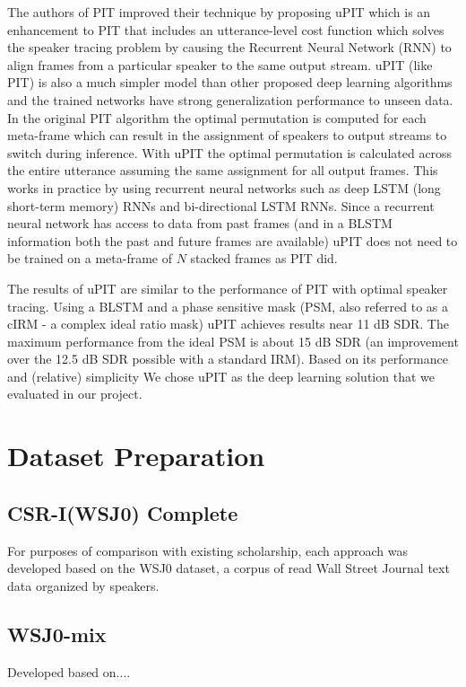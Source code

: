 \documentclass[journal, a4paper]{IEEEtran}
\begin{document}
The authors of PIT improved their technique by proposing uPIT which is an enhancement to PIT that includes an utterance-level cost function which solves the speaker tracing problem by causing the Recurrent Neural Network (RNN) to align frames from a particular speaker to the same output stream. uPIT (like PIT) is also a much simpler model than other proposed deep learning algorithms and the trained networks have strong generalization performance to unseen data. In the original PIT algorithm the optimal permutation is computed for each meta-frame which can result in the assignment of speakers to output streams to switch during inference. With uPIT the optimal permutation is calculated across the entire utterance assuming the same assignment for all output frames. This works in practice by using recurrent neural networks such as deep LSTM (long short-term memory) RNNs and bi-directional LSTM RNNs. Since a recurrent neural network has access to data from past frames (and in a BLSTM information both the past and future frames are available) uPIT does not need to be trained on a meta-frame of $N$ stacked frames as PIT did.

The results of uPIT are similar to the performance of PIT with optimal speaker tracing. Using a BLSTM and a phase sensitive mask (PSM, also referred to as a cIRM - a complex ideal ratio mask) uPIT achieves results near 11 dB SDR. The maximum performance from the ideal PSM is about 15 dB SDR (an improvement over the 12.5 dB SDR possible with a standard IRM). Based on its performance and (relative) simplicity We chose uPIT as the deep learning solution that we evaluated in our project.


\section{Dataset Preparation}
\subsection{CSR-I(WSJ0) Complete}
For purposes of comparison with existing scholarship, each approach was developed based on the WSJ0 dataset, a corpus of read Wall Street Journal text data organized by speakers.

\subsection{WSJ0-mix}

 
Developed based on...\cite{WSJmix}.
\end{document}
